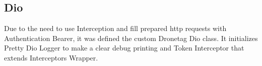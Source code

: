 \subsection{Dio}\label{subsec:dio-class}
Due to the need to use Interception and fill prepared \acrshort{http} requests with Authentication Bearer, it was defined the custom Dronetag Dio class.
It initializes Pretty Dio Logger to make a clear debug printing and Token Interceptor that extends Interceptors Wrapper.
